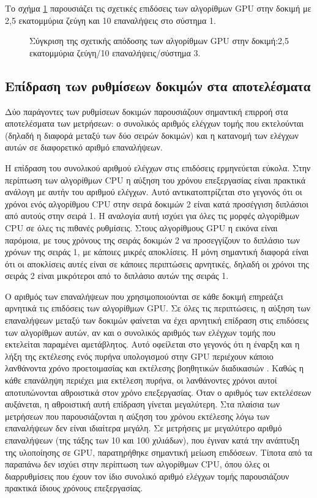 Το σχήμα \ref{effgpuexample} παρουσιάζει τις σχετικές επιδόσεις των αλγορίθμων GPU στην δοκιμή με 2,5 εκατομμύρια ζεύγη και 10 επαναλήψεις στο σύστημα 1.

\begin{figure}[h!]
\begin{center}
\scalebox{0.9}
{

}
\end{center}
\caption{Σύγκριση της σχετικής απόδοσης των αλγορίθμων GPU στην δοκιμή:2,5 εκατομμύρια ζεύγη/10 επαναλήψεις/σύστημα 3.}
\label{effgpuexample}
\end{figure}

\subsection{Επίδραση των ρυθμίσεων δοκιμών στα αποτελέσματα}
\noindent Δύο παράγοντες των ρυθμίσεων δοκιμών παρουσιάζουν σημαντική επιρροή στα αποτελέσματα των μετρήσεων: ο συνολικός αριθμός ελέγχων τομής που εκτελούνται (δηλαδή η διαφορά μεταξύ των δύο σειρών δοκιμών) και η κατανομή των ελέγχων αυτών σε διαφορετικό αριθμό επαναλήψεων.

Η επίδραση του συνολικού αριθμού ελέγχων στις επιδόσεις ερμηνεύεται εύκολα. Στην περίπτωση των αλγορίθμων CPU η αύξηση του χρόνου επεξεργασίας είναι πρακτικά ανάλογη με αυτήν του αριθμού ελέγχων. Αυτό αντικατοπτρίζεται στο γεγονός ότι οι χρόνοι ενός αλγορίθμου CPU στην σειρά δοκιμών 2 είναι κατά προσέγγιση διπλάσιοι από αυτούς στην σειρά 1. Η αναλογία αυτή ισχύει για όλες τις μορφές αλγορίθμων CPU σε όλες τις πιθανές ρυθμίσεις. Στους αλγορίθμους GPU η εικόνα είναι παρόμοια, με τους χρόνους της σειράς δοκιμών 2 να προσεγγίζουν το διπλάσιο των χρόνων της σειράς 1, με κάποιες μικρές αποκλίσεις. Η μόνη σημαντική διαφορά είναι ότι οι αποκλίσεις  αυτές είναι σε κάποιες περιπτώσεις αρνητικές, δηλαδή οι χρόνοι της σειράς 2 είναι μικρότεροι από το διπλάσιο αυτών της σειράς 1.

Ο αριθμός των επαναλήψεων που χρησιμοποιούνται σε κάθε δοκιμή επηρεάζει αρνητικά τις επιδόσεις των αλγορίθμων GPU. Σε όλες τις περιπτώσεις, η αύξηση των επαναλήψεων μεταξύ των δοκιμών φαίνεται να έχει αρνητική επίδραση στις επιδόσεις των αλγορίθμων αυτών, αν και ο συνολικός αριθμός των ελέγχων τομής που εκτελείται παραμένει αμετάβλητος. Αυτό οφείλεται στο γεγονός ότι η έναρξη και η λήξη της εκτέλεσης ενός πυρήνα υπολογισμού στην GPU περιέχουν κάποιο λανθάνοντα χρόνο προετοιμασίας και εκτέλεσης βοηθητικών διαδικασιών \cite{ATIOpenCL}. Καθώς η κάθε επανάληψη περιέχει μια εκτέλεση πυρήνα, οι λανθάνοντες χρόνοι αυτοί αποτυπώνονται αθροιστικά στον χρόνο επεξεργασίας. Όταν ο αριθμός των εκτελέσεων αυξάνεται, η αθροιστική αυτή επίδραση  γίνεται μεγαλύτερη. Στα πλαίσια των μετρήσεων που παρουσιάζονται η αύξηση του χρόνου εκτέλεσης λόγω των επαναλήψεων δεν είναι ιδιαίτερα μεγάλη. Σε μετρήσεις με μεγαλύτερο αριθμό επαναλήψεων (της τάξης των 10 και 100 χιλιάδων), που έγιναν κατά την ανάπτυξη της υλοποίησης σε GPU, 
παρατηρήθηκε σημαντική μείωση επιδόσεων. Τίποτα από τα παραπάνω δεν ισχύει στην περίπτωση των αλγορίθμων CPU, όπου όλες οι διαρρυθμίσεις που έχουν τον ίδιο συνολικό αριθμό ελέγχων τομής παρουσιάζουν πρακτικά ίδιους χρόνους επεξεργασίας.

